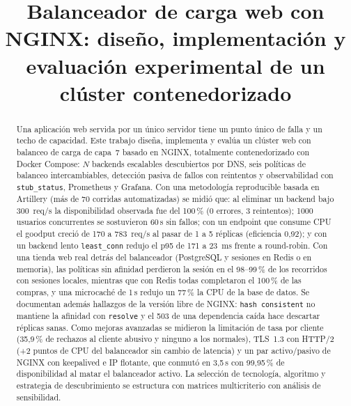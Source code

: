 \documentclass[conference]{IEEEtran}
\begin{document}
\title{Balanceador de carga web con NGINX: diseño, implementación y evaluación experimental de un clúster contenedorizado}

\author{
\and
{}
}

\maketitle

\begin{abstract}
Una aplicación web servida por un único servidor tiene un punto único de falla y un techo de capacidad. Este trabajo diseña, implementa y evalúa un clúster web con balanceo de carga de capa~7 basado en NGINX, totalmente contenedorizado con Docker Compose: $N$ backends escalables descubiertos por DNS, seis políticas de balanceo intercambiables, detección pasiva de fallos con reintentos y observabilidad con \texttt{stub\_status}, Prometheus y Grafana. Con una metodología reproducible basada en Artillery (más de 70 corridas automatizadas) se midió que: al eliminar un backend bajo 300~req/s la disponibilidad observada fue del 100\,\% (0 errores, 3 reintentos); 1000 usuarios concurrentes se sostuvieron 60\,s sin fallos; con un endpoint que consume CPU el goodput creció de 170 a 783~req/s al pasar de 1 a 5 réplicas (eficiencia 0,92); y con un backend lento \texttt{least\_conn} redujo el p95 de 171 a 23~ms frente a round-robin. Con una tienda web real detrás del balanceador (PostgreSQL y sesiones en Redis o en memoria), las políticas sin afinidad perdieron la sesión en el 98--99\,\% de los recorridos con sesiones locales, mientras que con Redis todas completaron el 100\,\% de las compras, y una microcaché de 1\,s redujo un 77\,\% la CPU de la base de datos. Se documentan además hallazgos de la versión libre de NGINX: \texttt{hash~consistent} no mantiene la afinidad con \texttt{resolve} y el 503 de una dependencia caída hace descartar réplicas sanas. Como mejoras avanzadas se midieron la limitación de tasa por cliente (35,9\,\% de rechazos al cliente abusivo y ninguno a los normales), TLS~1.3 con HTTP/2 (+2 puntos de CPU del balanceador sin cambio de latencia) y un par activo/pasivo de NGINX con keepalived e IP flotante, que conmutó en 3,5\,s con 99,95\,\% de disponibilidad al matar el balanceador activo. La selección de tecnología, algoritmo y estrategia de descubrimiento se estructura con matrices multicriterio con análisis de sensibilidad.
\end{abstract}
\end{document}
